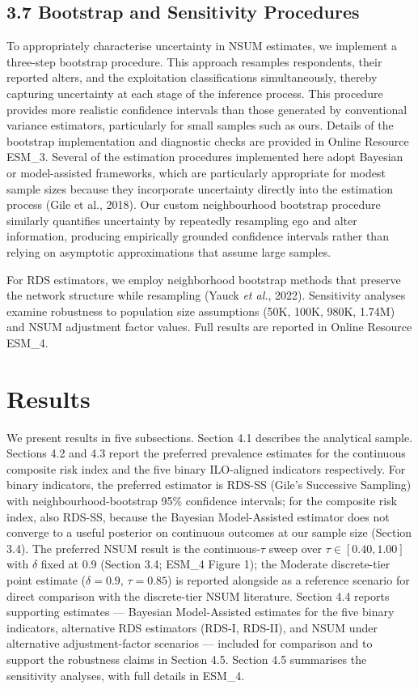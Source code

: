 \documentclass[
  12pt,
  letterpaper,
  DIV=11,
  numbers=noendperiod]{scrartcl}
\begin{document}
\subsection{3.7 Bootstrap and Sensitivity
Procedures}\label{bootstrap-and-sensitivity-procedures}

To appropriately characterise uncertainty in NSUM estimates, we
implement a three-step bootstrap procedure. This approach resamples
respondents, their reported alters, and the exploitation classifications
simultaneously, thereby capturing uncertainty at each stage of the
inference process. This procedure provides more realistic confidence
intervals than those generated by conventional variance estimators,
particularly for small samples such as ours. Details of the bootstrap
implementation and diagnostic checks are provided in Online Resource
ESM\_3. Several of the estimation procedures implemented here adopt
Bayesian or model-assisted frameworks, which are particularly
appropriate for modest sample sizes because they incorporate uncertainty
directly into the estimation process (Gile et al., 2018). Our custom
neighbourhood bootstrap procedure similarly quantifies uncertainty by
repeatedly resampling ego and alter information, producing empirically
grounded confidence intervals rather than relying on asymptotic
approximations that assume large samples.

For RDS estimators, we employ neighborhood bootstrap methods that
preserve the network structure while resampling (Yauck \emph{et al.},
2022). Sensitivity analyses examine robustness to population size
assumptions (50K, 100K, 980K, 1.74M) and NSUM adjustment factor values.
Full results are reported in Online Resource ESM\_4.

\section{Results}\label{results}

We present results in five subsections. Section 4.1 describes the
analytical sample. Sections 4.2 and 4.3 report the preferred prevalence
estimates for the continuous composite risk index and the five binary
ILO-aligned indicators respectively. For binary indicators, the
preferred estimator is RDS-SS (Gile's Successive Sampling) with
neighbourhood-bootstrap 95\% confidence intervals; for the composite
risk index, also RDS-SS, because the Bayesian Model-Assisted estimator
does not converge to a useful posterior on continuous outcomes at our
sample size (Section 3.4). The preferred NSUM result is the
continuous-\(\tau\) sweep over \(\tau \in [0.40, 1.00]\) with \(\delta\)
fixed at 0.9 (Section 3.4; ESM\_4 Figure 1); the Moderate discrete-tier
point estimate (\(\delta = 0.9\), \(\tau = 0.85\)) is reported alongside
as a reference scenario for direct comparison with the discrete-tier
NSUM literature. Section 4.4 reports supporting estimates --- Bayesian
Model-Assisted estimates for the five binary indicators, alternative RDS
estimators (RDS-I, RDS-II), and NSUM under alternative adjustment-factor
scenarios --- included for comparison and to support the robustness
claims in Section 4.5. Section 4.5 summarises the sensitivity analyses,
with full details in ESM\_4.
\end{document}
